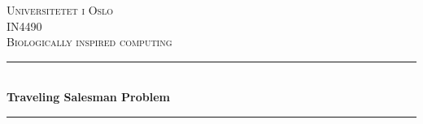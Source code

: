 \documentclass[a4paper, norsk, 12pt]{article}
\begin{document}
\begin{titlepage}

\newcommand{\HRule}{\rule{\linewidth}{0.5mm}} %

\center %


\textsc{\LARGE Universitetet i Oslo}\\[1.5cm] %
\textsc{\Large IN4490}\\[0.5cm] %
\textsc{\large Biologically inspired computing}\\[0.5cm] %


\HRule \\[0.4cm]
{ \huge \bfseries Traveling Salesman Problem}\\[0.4cm] %
\HRule \\[1.5cm]




\Large


\end{titlepage}
\end{document}
